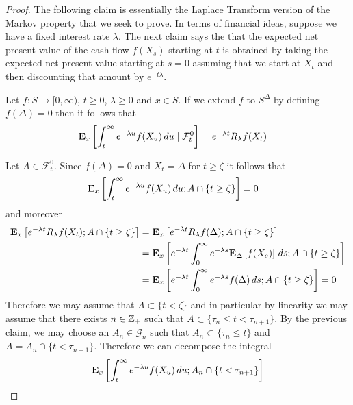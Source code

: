 \begin{proof}
The following claim is essentially the Laplace Transform version of
the Markov property that we seek to prove.  In terms of financial
ideas, suppose we have a fixed interest rate $\lambda$.  The next claim says the that the expected net present value of the cash flow $f(X_s)$ starting at $t$ 
is obtained by taking the expected net present value starting at $s=0$ assuming that we start at $X_t$ and then discounting that amount by $e^{-t\lambda}$.
\begin{clm}\label{PureJumpTypeConstruction:ConditionalExpectationOfExponentials}Let $f : S \to [0, \infty)$, $t \geq 0$, $\lambda \geq 0$  and $x \in S$.  If we extend $f$ to $S^\Delta$ by defining $f(\Delta) = 0$ then it follows that
\begin{align*}
\csexpectationlong{\mathcal{F}^0_t}{\int_t^\infty e^{-\lambda u} f(X_u) \, du}{x} 
&= e^{-\lambda t} R_\lambda f(X_t)
\end{align*}
\end{clm}
Let $A \in \mathcal{F}^0_t$.  Since $f(\Delta) = 0$ and $X_t = \Delta$ for $t \geq \zeta$ it follows that 
\begin{align*}
\sexpectation{\int_t^\infty e^{-\lambda u} f(X_u) \, du ; A \cap \lbrace t \geq \zeta \rbrace}{x} &= 0
\end{align*}
and moreover
\begin{align*}
\sexpectation{e^{-\lambda t} R_\lambda f(X_t); A \cap \lbrace t \geq \zeta \rbrace}{x}
&=\sexpectation{e^{-\lambda t} R_\lambda f(\Delta); A \cap \lbrace t \geq \zeta \rbrace}{x} \\
&=\sexpectation{e^{-\lambda t} \int_0^\infty e^{-\lambda s} \sexpectation{f(X_s)}{\Delta} \, ds; A \cap \lbrace t \geq \zeta \rbrace}{x} \\
&=\sexpectation{e^{-\lambda t} \int_0^\infty e^{-\lambda s} f(\Delta)\, ds; A \cap \lbrace t \geq \zeta \rbrace}{x} = 0 \\
\end{align*}
Therefore we may assume that $A \subset \lbrace t < \zeta \rbrace$ and in particular by linearity we may assume that there exists $n \in \integers_+$ such that
$A \subset \lbrace \tau_n \leq t < \tau_{n+1}\rbrace$.  By the previous claim, we may choose an $A_n \in \mathcal{G}_n$ such that $A_n \subset \lbrace \tau_n \leq t \rbrace$ and $A = A_n \cap \lbrace t < \tau_{n+1} \rbrace$.  Therefore we can decompose the integral
\begin{align*}
&\sexpectation{\int_t^\infty e^{-\lambda u} f(X_u) \, du ; A_n \cap \lbrace t < \tau_{n+1} \rbrace}{x} \\

\end{align*}
\end{proof}
